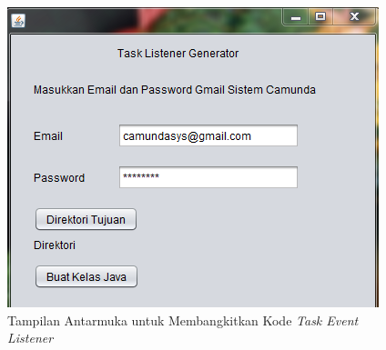 	\begin{figure}[H]
			\centering
			\includegraphics[scale=1]{Gambar/Bab-4/UI/1}
			\caption{Tampilan Antarmuka untuk Membangkitkan Kode \textit{Task Event Listener}} 
			\label{fig:perancangansistem_antarmuka}
	\end{figure}
	


 